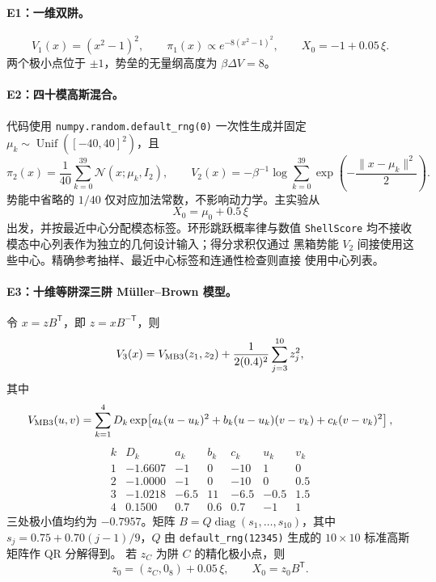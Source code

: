 \documentclass[11pt,a4paper]{article}
\begin{document}
\paragraph{E1：一维双阱。}
\begin{equation}
 V_1(x)=(x^2-1)^2,\qquad
 \pi_1(x)\propto e^{-8(x^2-1)^2},\qquad
 X_0=-1+0.05\,\xi .
\end{equation}
两个极小点位于 $\pm1$，势垒的无量纲高度为
$\beta\Delta V=8$。

\paragraph{E2：四十模高斯混合。}
代码使用 \texttt{numpy.random.default\_rng(0)} 一次性生成并固定
\(\mu_k\sim\operatorname{Unif}([-40,40]^2)\)，且
\begin{equation}
 \pi_2(x)=\frac1{40}\sum_{k=0}^{39}\mathcal N(x;\mu_k,I_2),
 \qquad
 V_2(x)=-\beta^{-1}\log\sum_{k=0}^{39}
 \exp\!\left(-\frac{\|x-\mu_k\|^2}{2}\right).
\end{equation}
势能中省略的 $1/40$ 仅对应加法常数，不影响动力学。主实验从
\begin{equation}
 X_0=\mu_0+0.5\,\xi
\end{equation}
出发，并按最近中心分配模态标签。环形跳跃概率律与数值
\texttt{ShellScore} 均不接收模态中心列表作为独立的几何设计输入；得分求积仅通过
黑箱势能 $V_2$ 间接使用这些中心。精确参考抽样、最近中心标签和连通性检查则直接
使用中心列表。

\paragraph{E3：十维等阱深三阱 Müller--Brown 模型。}
令 $x=zB^{\mathsf T}$，即 $z=xB^{-\mathsf T}$，则
\begin{equation}
 V_3(x)=V_{\rm MB3}(z_1,z_2)
 +\frac{1}{2(0.4)^2}\sum_{j=3}^{10}z_j^2 ,
\end{equation}
其中
\begin{equation}
 V_{\rm MB3}(u,v)=\sum_{k=1}^{4}D_k
 \exp\!\left[a_k(u-u_k)^2+b_k(u-u_k)(v-v_k)
 +c_k(v-v_k)^2\right],
\end{equation}
\begin{equation*}
\begin{array}{c|rrrrrr}
k&D_k&a_k&b_k&c_k&u_k&v_k\\\hline
1&-1.6607&-1&0&-10&1&0\\
2&-1.0000&-1&0&-10&0&0.5\\
3&-1.0218&-6.5&11&-6.5&-0.5&1.5\\
4& 0.1500&0.7&0.6&0.7&-1&1
\end{array}
\end{equation*}
三处极小值均约为 $-0.7957$。矩阵
\(B=Q\operatorname{diag}(s_1,\ldots,s_{10})\)，其中
\(s_j=0.75+0.70(j-1)/9\)，$Q$ 由
\texttt{default\_rng(12345)} 生成的 $10\times10$ 标准高斯矩阵作 QR 分解得到。
若 $z_C$ 为阱 $C$ 的精化极小点，则
\begin{equation}
 z_0=(z_C,0_8)+0.05\,\xi,\qquad X_0=z_0B^{\mathsf T}.
\end{equation}
\end{document}
